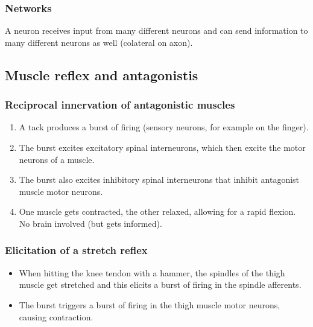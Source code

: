 \documentclass[main]{subfiles}
\begin{document}
\subsubsection{Networks}
A neuron receives input from many different neurons and can send information to many different neurons as well (colateral on axon).

\subsection{Muscle reflex and antagonistis}
\subsubsection{Reciprocal innervation of antagonistic muscles}
\begin{enumerate}
	\item A tack produces a burst of firing (sensory neurons, for example on the finger).
	\item The burst excites excitatory spinal interneurons, which then excite the motor neurons of a muscle.
	\item The burst also excites inhibitory spinal interneurons that inhibit antagonist muscle motor neurons.
	\item One muscle gets contracted, the other relaxed, allowing for a rapid flexion. No brain involved (but gets informed).
\end{enumerate}
\subsubsection{Elicitation of a stretch reflex}
\begin{itemize}[noitemsep,nolistsep]
	\item When hitting the knee tendon with a hammer, the spindles of the thigh muscle get stretched and this elicits a burst of firing in the spindle afferents.
	\item The burst triggers a burst of firing in the thigh muscle motor neurons, causing contraction.
\end{itemize}
\end{document}
